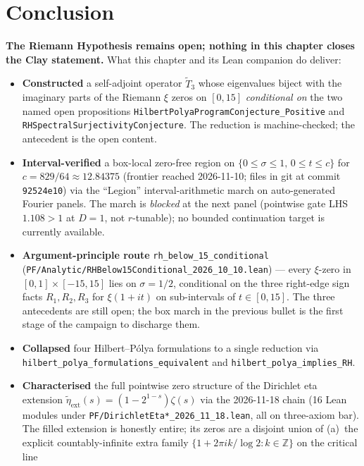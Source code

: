 \section{Conclusion}

\textbf{The Riemann Hypothesis remains open; nothing in this chapter closes the Clay statement.}  What this chapter and its Lean companion do deliver:

\begin{itemize}
\item \textbf{Constructed} a self-adjoint operator $\tilde{T}_3$ whose eigenvalues biject with the imaginary parts of the Riemann $\xi$ zeros on $[0, 15]$ \emph{conditional on} the two named open propositions \texttt{HilbertPolyaProgramConjecture\_Positive} and \texttt{RHSpectralSurjectivityConjecture}.  The reduction is machine-checked; the antecedent is the open content.
\item \textbf{Interval-verified} a box-local zero-free region on $\{0 \le \sigma \le 1,\, 0 \le t \le c\}$ for $c = 829/64 \approx 12.84375$ (frontier reached 2026-11-10; files in git at commit \texttt{92524e10}) via the ``Legion'' interval-arithmetic march on auto-generated Fourier panels.  The march is \emph{blocked} at the next panel (pointwise gate LHS $1.108 > 1$ at $D = 1$, not $r$-tunable); no bounded continuation target is currently available.
\item \textbf{Argument-principle route} \texttt{rh\_below\_15\_conditional} (\texttt{PF/Analytic/RHBelow15Conditional\_2026\_10\_10.lean}) --- every $\xi$-zero in $[0,1] \times [-15, 15]$ lies on $\sigma = 1/2$, conditional on the three right-edge sign facts $R_1, R_2, R_3$ for $\xi(1 + it)$ on sub-intervals of $t \in [0, 15]$.  The three antecedents are still open; the box march in the previous bullet is the first stage of the campaign to discharge them.
\item \textbf{Collapsed} four Hilbert--P\'olya formulations to a single reduction via \texttt{hilbert\_polya\_formulations\_equivalent} and \texttt{hilbert\_polya\_implies\_RH}.
\item \textbf{Characterised} the full pointwise zero structure of
the Dirichlet eta extension
$\widetilde{\eta}_{\mathrm{ext}}(s) = (1 - 2^{1-s}) \zeta(s)$ via
the 2026-11-18 chain (16 Lean modules under
\texttt{PF/DirichletEta*\_2026\_11\_18.lean}, all on three-axiom
bar).  The filled extension is honestly entire; its zeros are a
disjoint union of (a)~the explicit countably-infinite extra family
$\{1 + 2\pi i k / \log 2 : k \in \mathbb{Z}\}$ on the critical line

\end{itemize}
